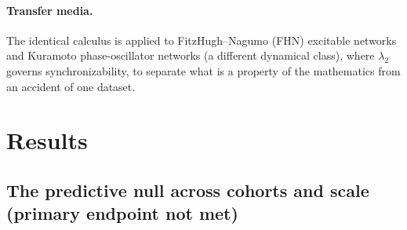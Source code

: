 \documentclass[11pt]{article}
\theoremstyle{definition}
\newcommand{\lam}{\lambda}
\begin{document}
\paragraph{Transfer media.} The identical calculus is applied to
FitzHugh--Nagumo (FHN) excitable networks and Kuramoto phase-oscillator networks
(a different dynamical class), where $\lam_2$ governs synchronizability, to
separate what is a property of the mathematics from an accident of one dataset.

\section{Results}
\label{sec:results}

\subsection{The predictive null across cohorts and scale (primary endpoint not met)}
\label{sec:null}
\end{document}
